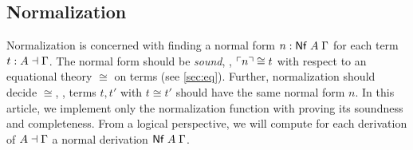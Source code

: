 \documentclass[sigplan,screen]{acmart}
\begin{document}



\subsection{Normalization}

Normalization is concerned with finding a normal form
$n : \mathsf{Nf}\;A\;\Gamma$ for each term $t : A \dashv \Gamma$.
The normal form should be \emph{sound},
\ie, $\ulcorner n\urcorner \cong t$
with respect to an equational theory $\cong$ on terms
(see \cref{sec:eq}).
Further, normalization should decide $\cong$, \ie,
terms $t,t'$ with $t \cong t'$ should have the same normal form $n$.
In this article, we implement only the normalization function
with proving its soundness and completeness.
From a logical perspective, we will compute for each derivation of $A
\dashv \Gamma$ a normal derivation $\mathsf{Nf}\;A\;\Gamma$.


\end{document}

